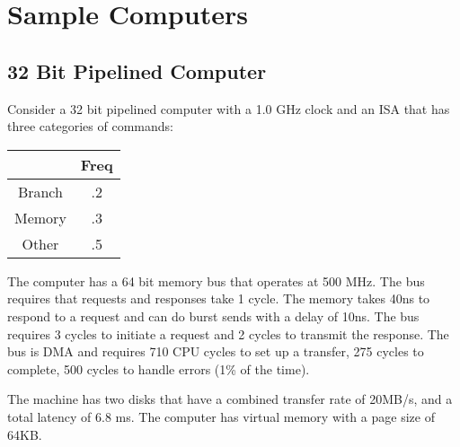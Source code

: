 \chapter{Sample Computers}
\label{c-samples}

\section{32 Bit Pipelined Computer}
Consider a 32 bit pipelined computer with a 1.0 GHz clock and an ISA that has three categories of commands:

\begin{tabular}{|c|c|} \hline
          & Freq \\ \hline
  Branch  & .2   \\ \hline
  Memory  & .3   \\ \hline
  Other   & .5   \\ \hline
\end{tabular}

The computer has a 64 bit memory bus that operates at 500 MHz.  The bus requires that requests and responses take 1 cycle.  The memory takes 40ns to respond to a request and can do burst sends with a delay of 10ns.  The bus requires 3 cycles to initiate a request and 2 cycles to transmit the response.  The bus is DMA and requires 710 CPU cycles to set up a transfer, 275 cycles to complete, 500 cycles to handle errors (1\% of the time).

The machine has two disks that have a combined transfer rate of 20MB/s, and a total latency of 6.8 ms.  The computer has virtual memory with a page size of 64KB.


